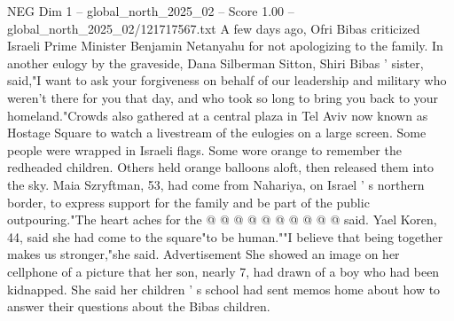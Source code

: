 \begin{textsample}{NEG Dim 1 – global\_north\_2025\_02 – Score 1.00 – global\_north\_2025\_02/121717567.txt}
A few days ago, Ofri Bibas criticized Israeli Prime Minister Benjamin Netanyahu for not apologizing to the family.
In another eulogy by the graveside, Dana Silberman Sitton, Shiri Bibas ' sister, said,"I want to ask your forgiveness on behalf of our leadership and military who weren't there for you that day, and who took so long to bring you back to your homeland."Crowds also gathered at a central plaza in Tel Aviv now known as Hostage Square to watch a livestream of the eulogies on a large screen.
Some people were wrapped in Israeli flags.
Some wore orange to remember the redheaded children.
Others held orange balloons aloft, then released them into the sky.
Maia Szryftman, 53, had come from Nahariya, on Israel ' s northern border, to express support for the family and be part of the public outpouring."The heart aches for the @ @ @ @ @ @ @ @ @ @ said.
Yael Koren, 44, said she had come to the square"to be human.""I believe that being together makes us stronger,"she said.
Advertisement She showed an image on her cellphone of a picture that her son, nearly 7, had drawn of a boy who had been kidnapped.
She said her children ' s school had sent memos home about how to answer their questions about the Bibas children.

\end{textsample}
